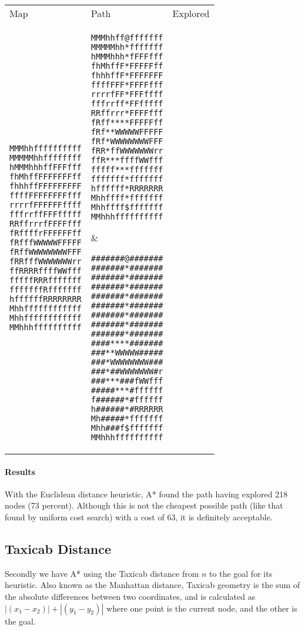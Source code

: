 \documentclass[12pt, article]{scrartcl}
\begin{document}
\begin{tabular}{p{2in} p{2in} p{2in}}
Map & Path & Explored \\

\begin{verbatim}
MMMhhffffffffff
MMMMMhhffffffff
hMMMhhhffFFFfff
fhMhffFFFFFFFff
fhhhffFFFFFFFFF
ffffFFFFFFFFfff
rrrrfFFFFFFffff
fffrrffFFFfffff
RRffrrrfFFFFfff
fRffffrFFFFFFff
fRfffWWWWWFFFFF
fRffWWWWWWWWFFF
fRRfffWWWWWWWrr
ffRRRRffffWWfff
fffffRRRfffffff
fffffffRfffffff
hffffffRRRRRRRR
Mhhffffffffffff
Mhhffffffffffff
MMhhhffffffffff
\end{verbatim}
&
\begin{verbatim}
MMMhhff@fffffff
MMMMMhh*fffffff
hMMMhhh*fFFFfff
fhMhffF*FFFFFff
fhhhffF*FFFFFFF
ffffFFF*FFFFfff
rrrrfFF*FFFffff
fffrrff*FFfffff
RRffrrr*FFFFfff
fRff****FFFFFff
fRf**WWWWWFFFFF
fRf*WWWWWWWWFFF
fRR*ffWWWWWWWrr
ffR***ffffWWfff
fffff***fffffff
fffffff*fffffff
hffffff*RRRRRRR
Mhhffff*fffffff
Mhhffff$fffffff
MMhhhffffffffff
\end{verbatim}
&
\begin{verbatim}
#######@#######
#######*#######
#######*#######
#######*#######
#######*#######
#######*#######
#######*#######
#######*#######
#######*#######
####****#######
###**WWWWW#####
###*WWWWWWWW###
###*##WWWWWWW#r
###***###fWWfff
#####***#ffffff
f######*#ffffff
h######*#RRRRRR
Mh#####*fffffff
Mhh###f$fffffff
MMhhhffffffffff
\end{verbatim}
\end{tabular}
\paragraph{Results}
With the Euclidean distance heuristic, A* found the path having explored 218 nodes (73 percent). Although this is not the cheapest possible path (like that found by uniform cost search) with a cost of 63, it is definitely acceptable. \\

\subsection{Taxicab Distance}
Secondly we have A* using the Taxicab distance from $n$ to the goal for its heuristic. Also known as the Manhattan distance, Taxicab geometry is the sum of the absolute differences between two coordinates, and is calculated as $|(x_1-x_2)| + |(y_1-y_2)|$ where one point is the current node, and the other is the goal.\\
\end{document}
